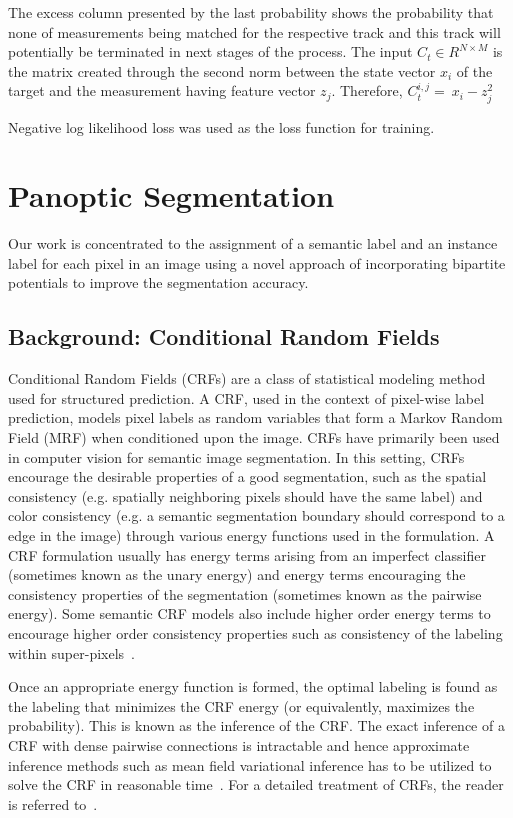 The excess column presented by the last probability shows the probability that none of measurements being matched for the respective track and this track will potentially be terminated in next stages of the process.
The input $C_t\in R^{N\times M}$ is the matrix created through the second norm between the state vector $x_i$ of the target and the measurement having feature vector $z_j$.
Therefore, $C_t^{i,j}=\ x_i-z_j^2$

Negative log likelihood loss was used as the loss function for training. 


\section{Panoptic Segmentation}
Our work is concentrated to the assignment of a semantic label and an instance label for each pixel in an image using a novel approach of incorporating bipartite potentials to improve the segmentation accuracy.

\subsection{Background: Conditional Random Fields}

Conditional Random Fields (CRFs) are a class of statistical modeling method used for structured prediction. A CRF, used in the context of pixel-wise label prediction, models pixel labels as random variables that form a Markov Random Field (MRF) when conditioned upon the image. CRFs have primarily been used in computer vision for semantic image segmentation. In this setting, CRFs encourage the desirable properties of a good segmentation, such as the spatial consistency (e.g. spatially neighboring pixels should have the same label) and color consistency (e.g. a semantic segmentation boundary should correspond to a edge in the image) through various energy functions used in the formulation. A CRF formulation usually has energy terms arising from an imperfect classifier (sometimes known as the unary energy) and energy terms encouraging the consistency properties of the segmentation (sometimes known as the pairwise energy). Some semantic CRF models also include higher order energy terms to encourage higher order consistency properties such as consistency of the labeling within super-pixels~\cite{arnab_eccv_2016}.

Once an appropriate energy function is formed, the optimal labeling is found as the labeling that minimizes the CRF energy (or equivalently, maximizes the probability). This is known as the inference of the CRF. The exact inference of a CRF with dense pairwise connections is intractable and hence approximate inference methods such as mean field variational inference has to be utilized to solve the CRF in reasonable time~\cite{densecrf}. For a detailed treatment of CRFs, the reader is referred to~\cite{Koller_book}. 


